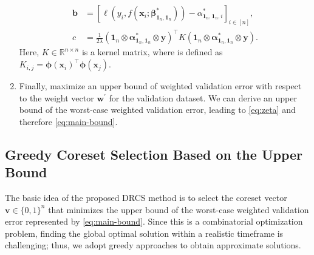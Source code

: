\begin{enumerate}
\begin{align*}
		\\  
		\bm b  
		&=  
		\left[\ell(y_i, f(\bm x_i; \bm \beta_{\bm 1_n, \bm 1_n}^*)) - {\alpha}_{\bm 1_n, \bm 1_n, i}^* \right]_{i \in [n]},  
		\\  
		c  
		&=  
		\frac{1}{2\lambda} (\bm 1_n \otimes \bm\alpha_{\bm 1_n, \bm 1_n}^* \otimes \boldsymbol{y})^{\top} K (\bm 1_n \otimes \bm\alpha_{\bm 1_n, \bm 1_n}^* \otimes \boldsymbol{y}).
		\end{align*}
    Here, $K \in \mathbb{R}^{n \times n}$ is a kernel matrix, where is defined as $K_{i,j} = \bm{\phi}(\bm{x}_i)^\top \bm{\phi}(\bm{x}_j)$.
  \item
  Finally, maximize an upper bound of weighted validation error with respect to the weight vector $\bm w^\prime$ for the validation dataset.
  We can derive an upper bound of the worst-case weighted validation error, leading to \eqref{eq:zeta} and therefore \eqref{eq:main-bound}.
\end{enumerate}


\subsection{Greedy Coreset Selection Based on the Upper Bound}
\label{subsec:GrCS}
%
The basic idea of the proposed DRCS method is to select the coreset vector $\bm v \in \{0, 1\}^n$ that minimizes the upper bound of the worst-case weighted validation error represented by \eqref{eq:main-bound}.
%
Since this is a combinatorial optimization problem, finding the global optimal solution within a realistic timeframe is challenging; thus, we adopt greedy approaches to obtain approximate solutions.
%


